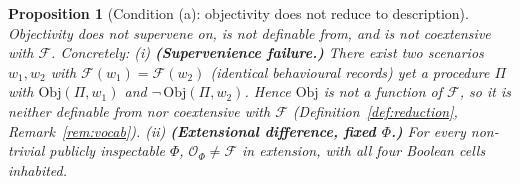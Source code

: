 \documentclass{amsart}
\theoremstyle{definition}
\theoremstyle{plain}
\newtheorem{proposition}{Proposition}
\theoremstyle{remark}
\begin{document}
\begin{proposition}[Condition (a): objectivity does not reduce to description]
\label{prop:a}
Objectivity does not supervene on, is not definable from, and is not coextensive
with $\mathcal{F}$. Concretely:
\emph{(i)} \textbf{(Supervenience failure.)} There exist two scenarios
$w_1,w_2$ with $\mathcal{F}(w_1)=\mathcal{F}(w_2)$ (identical behavioural
records) yet a procedure $\Pi$ with $\mathrm{Obj}(\Pi,w_1)$ and
$\neg\,\mathrm{Obj}(\Pi,w_2)$. Hence $\mathrm{Obj}$ is not a function of
$\mathcal{F}$, so it is neither definable from nor coextensive with
$\mathcal{F}$ (Definition~\ref{def:reduction}, Remark~\ref{rem:vocab}).
\emph{(ii)} \textbf{(Extensional difference, fixed $\Phi$.)} For every
non-trivial publicly inspectable $\Phi$, $\mathcal{O}_\Phi\neq\mathcal{F}$ in
extension, with all four Boolean cells inhabited.
\end{proposition}
\end{document}
